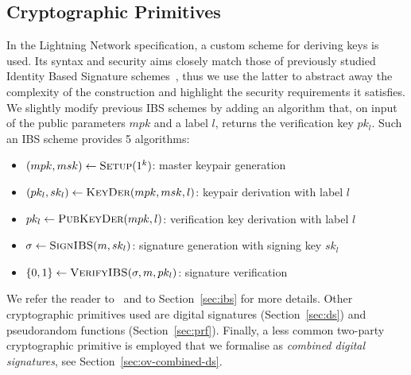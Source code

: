   \subsection{Cryptographic Primitives}
    In the Lightning Network specification, a custom scheme for deriving keys is
    used. Its syntax and security aims closely match those of previously studied
    Identity Based Signature schemes~\cite{ibsshamir,ibspaterson}, thus we use
    the latter to abstract away the complexity of the construction and highlight
    the security requirements it satisfies. We slightly modify previous IBS
    schemes by adding an algorithm that, on input of the public parameters $mpk$
    and a label $l$, returns the verification key $pk_l$. Such an IBS scheme
    provides 5 algorithms:
    \begin{itemize}
      \item $(mpk, msk) \leftarrow \textsc{Setup}(1^k)$: master keypair
      generation
      \item $(pk_l, sk_l) \leftarrow \textsc{KeyDer}(mpk, msk, l)$: keypair
      derivation with label $l$
      \item $pk_l \leftarrow \textsc{PubKeyDer}(mpk, l)$: verification key
      derivation with label $l$
      \item $\sigma \leftarrow \textsc{SignIBS}(m, sk_l)$: signature generation
      with signing key $sk_l$
      \item $\{0, 1\} \leftarrow \textsc{VerifyIBS}(\sigma, m, pk_l)$: signature
      verification
    \end{itemize}
    We refer the reader to~\cite{ibspaterson} and to Section~\ref{sec:ibs} for more details. Other
    cryptographic primitives used are digital signatures (Section~\ref{sec:ds}) and pseudorandom
    functions (Section~\ref{sec:prf}). Finally, a less common two-party cryptographic primitive is
    employed that we formalise as \emph{combined digital signatures}, see
    Section~\ref{sec:ov-combined-ds}.

